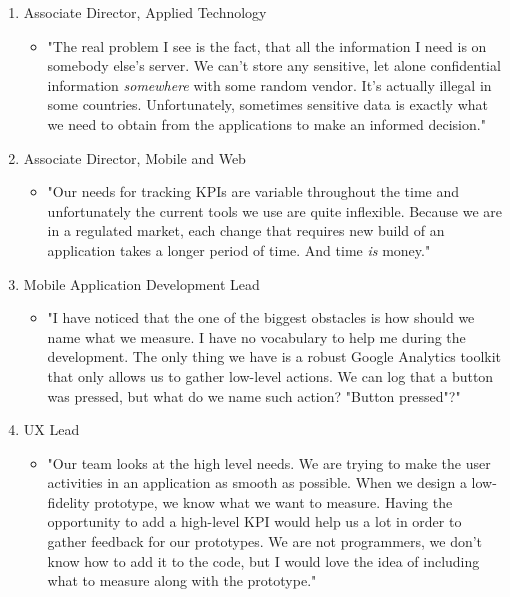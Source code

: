 \begin{enumerate}
		\item Associate Director, Applied Technology
		\begin{itemize}
				\item[] "The real problem I see is the fact, that all the information I need is on somebody else's server. We can't store any sensitive, let alone confidential information \emph{somewhere} with some random vendor. It's actually illegal in some countries. Unfortunately, sometimes sensitive data is exactly what we need to obtain from the applications to make an informed decision."
		\end{itemize}	

		\item Associate Director, Mobile and Web
		\begin{itemize}
				\item[] "Our needs for tracking KPIs are variable throughout the time and unfortunately the current tools we use are quite inflexible. Because we are in a regulated market, each change that requires new build of an application takes a longer period of time. And time \emph{is} money."
		\end{itemize}				
		
		\item Mobile Application Development Lead
		\begin{itemize}
				\item[] "I have noticed that the one of the biggest obstacles is how should we name what we measure. I have no vocabulary to help me during the development. The only thing we have is a robust Google Analytics toolkit that only allows us to gather low-level actions. We can log that a button was pressed, but what do we name such action? "Button pressed"?"
		\end{itemize}
		
		\item UX Lead
		\begin{itemize}
				\item[] "Our team looks at the high level needs. We are trying to make the user activities in an application as smooth as possible. When we design a low-fidelity prototype, we know what we want to measure. Having the opportunity to add a high-level KPI would help us a lot in order to gather feedback for our prototypes. We are not programmers, we don't know how to add it to the code, but I would love the idea of including what to measure along with the prototype."
		\end{itemize}
\end{enumerate}


